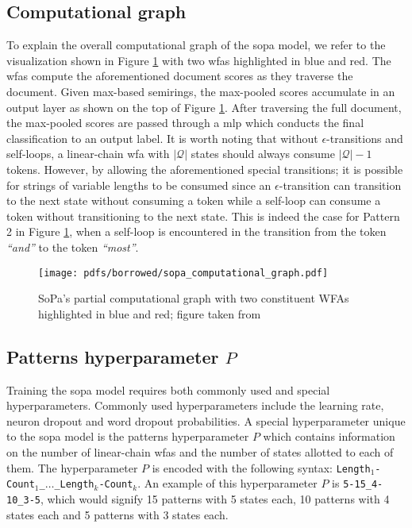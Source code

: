 \subsection{Computational graph}

\label{section:sopa_cg}

To explain the overall computational graph of the \ac{sopa} model, we refer to the
visualization shown in Figure \ref{fig:sopa} with two \ac{wfas} highlighted in
blue and red. The \ac{wfas} compute the aforementioned document scores as they
traverse the document. Given max-based semirings, the max-pooled scores
accumulate in an output layer as shown on the top of Figure \ref{fig:sopa}.
After traversing the full document, the max-pooled scores are passed through a
\ac{mlp} which conducts the final classification to an output label. It is worth
noting that without $\epsilon$-transitions and self-loops, a linear-chain
\ac{wfa} with $|\mathcal{Q}|$ states should always consume $\mathcal{|Q|}-1$
tokens. However, by allowing the aforementioned special transitions; it is
possible for strings of variable lengths to be consumed since an
$\epsilon$-transition can transition to the next state without consuming a token
while a self-loop can consume a token without transitioning to the next state.
This is indeed the case for Pattern 2 in Figure \ref{fig:sopa}, when a self-loop
is encountered in the transition from the token \textit{``and''} to the token
\textit{``most''}.

\begin{figure}[t]
  \centering
  \texttt{[image: pdfs/borrowed/sopa\_computational\_graph.pdf]}
  \caption{SoPa's partial computational graph with two constituent
    WFAs highlighted in blue and red; figure taken from
    \citet{schwartz2018sopa}}
  \label{fig:sopa}
\end{figure}

\subsection{Patterns hyperparameter $P$}

Training the \ac{sopa} model requires both commonly used and special hyperparameters.
Commonly used hyperparameters include the learning rate, neuron dropout and word
dropout probabilities. A special hyperparameter unique to the \ac{sopa} model is the
patterns hyperparameter $P$ which contains information on the number of
linear-chain \ac{wfas} and the number of states allotted to each of them. The
hyperparameter $P$ is encoded with the following syntax:
\texttt{Length$_{1}$-Count$_{1}$\_$\dots$\_Length$_{k}$-Count$_{k}$}. An example
of this hyperparameter $P$ is \texttt{5-15\_4-10\_3-5}, which would signify 15
patterns with 5 states each, 10 patterns with 4 states each and 5 patterns with
3 states each.

